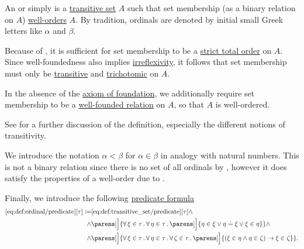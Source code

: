\begin{definition}\label{def:ordinal}
  An  or simply  is a \hyperref[def:transitive_set]{transitive set} \( A \) such that set membership (as a binary relation on \( A \)) \hyperref[def:well_ordered_set]{well-orders} \( A \). By tradition, ordinals are denoted by initial small Greek letters like \( \alpha \) and \( \beta \).

  Because of , it is sufficient for set membership to be a \hyperref[def:totally_ordered_set]{strict total order} on \( A \). Since well-foundedness also implies \hyperref[def:binary_relation/irreflexive]{irreflexivity}, it follows that set membership must only be \hyperref[def:binary_relation/transitive]{transitive} and \hyperref[def:binary_relation/trichotomic]{trichotomic} on \( A \).

  In the absence of the \hyperref[def:zfc/foundation]{axiom of foundation}, we additionally require set membership to be a \hyperref[def:well_founded_relation]{well-founded relation} on \( A \), so that \( A \) is well-ordered.

  See  for a further discussion of the definition, especially the different notions of transitivity.

  We introduce the notation \( \alpha < \beta \) for \( \alpha \in \beta \) in analogy with natural numbers. This is not a binary relation since there is no set of all ordinals by , however it does satisfy the properties of a well-order due to .

  Finally, we introduce the following \hyperref[rem:predicate_formula]{predicate formula}
  \begin{equation*}\taglabel[\op{IsOrdinal}]{eq:def:ordinal/predicate}
    \begin{aligned}
      \ref{eq:def:ordinal/predicate}[\tau] \coloneqq
        &\ref{eq:def:transitive_set/predicate}[\tau]
        \wedge \\ \wedge&
        \parens[\Big]
        {
          \qforall {\xi \in \tau}
          \qforall {\eta \in \tau}
          \parens[\Big]
            {
              \eta \in \xi \vee \eta \doteq \xi \vee \xi \in \eta
            }
        }
        \wedge \\ \wedge&
        \parens[\Big]
        {
          \qforall {\xi \in \tau}
          \qforall {\eta \in \tau}
          \qforall {\zeta \in \tau}
          \parens[\Big]
          {
            (\xi \in \eta \wedge \eta \in \zeta) \rightarrow \xi \in \zeta
          }
        }.
    \end{aligned}
  \end{equation*}
\end{definition}

